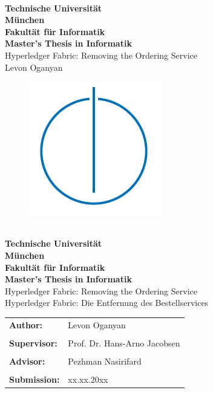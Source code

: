 \documentclass[12pt]{report}
\begin{document}
\hoffset=5mm
\thispagestyle{empty}
\begin{center}
	\bigskip \bigskip \bigskip
	\oTUM{6.0cm} \\
	\vspace*{0.8cm}
	{\huge \bf Technische Universität} \\
	\bigskip
	{\huge \bf München} \\
	\bigskip \bigskip \bigskip
	{\huge \bf Fakultät für Informatik} \\
	\bigskip \bigskip \bigskip
	{\Large \bf Master's Thesis in Informatik} \\
	\bigskip \bigskip \bigskip \bigskip \bigskip
	{\Large Hyperledger Fabric: Removing the Ordering Service} \\
	\bigskip \bigskip \bigskip \bigskip
	{\Large Levon Oganyan} \\
	\bigskip
	\begin{figure}[ht]
	\centering \includegraphics[width=0.2\linewidth]{figures/infologo.jpg}
	\end{figure}
	\bigskip
\end{center}
\vfill

\newpage
\hoffset=5mm
\thispagestyle{empty}
\begin{center}
	\bigskip \bigskip \bigskip
	\oTUM{6.0cm} \\
	\vspace*{0.8cm}
	{\huge \bf Technische Universität} \\
	\bigskip
	{\huge \bf München} \\
	\bigskip \bigskip \bigskip
	{\huge \bf Fakultät für Informatik} \\
	\bigskip \bigskip \bigskip
	{\Large \bf Master's Thesis in Informatik} \\
	\bigskip \bigskip \bigskip \bigskip \bigskip
	{\Large Hyperledger Fabric: Removing the Ordering Service} \\
	\bigskip \bigskip \bigskip
	{\Large Hyperledger Fabric: Die Entfernung des Bestellservices} \\
	\bigskip
\end{center}
\vfill
\begin{tabular}{ll}
{\Large \bf Author:} & {\Large Levon Oganyan} \\\\
{\Large \bf Supervisor:} & {\Large Prof. Dr. Hans-Arno Jacobsen} \\\\
{\Large \bf Advisor:} & {\Large Pezhman Nasirifard} \\\\
{\Large \bf Submission:} & {\Large xx.xx.20xx}
\end{tabular}
\end{document}
